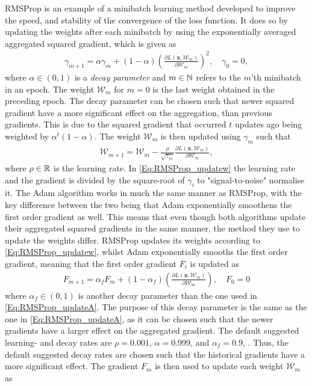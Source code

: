 RMSProp is an example of a minibatch learning method developed to improve the speed, and stability of the convergence of the loss function. It does so by updating the weights after each minibatch by using the exponentially averaged aggregated squared gradient, which is given as
\begin{align}\label{Eq:RMSProp_updateA}
    \gamma_{m+1} = \alpha \gamma_m + \left(1-\alpha\right)\left(\frac{\partial L(\bm{x}, \mathcal{W}_m)}{\partial \mathcal{W}_m}\right)^2,\quad \gamma_0=0,
\end{align}
where $\alpha\in(0,1)$ is a \emph{decay parameter} and $m\in\mathbb{N}$ refers to the $m$'th minibatch in an epoch. The weight $\mathcal{W}_m$ for $m=0$ is the last weight obtained in the preceding epoch. The decay parameter can be chosen such that newer squared gradient have a more significant effect on the aggregation, than previous gradients. This is due to the squared gradient that occurred $t$ updates ago being weighted by $\alpha^{t}(1-\alpha)$. The weight $\mathcal{W}_m$ is then updated using $\gamma_m$ such that
\begin{align}\label{Eq:RMSProp_updatew}
    \mathcal{W}_{m+1} = \mathcal{W}_{m} - \frac{\rho}{\sqrt{\gamma_m}} \frac{\partial L(\bm{x}, \mathcal{W}_m)}{\partial \mathcal{W}_m},
\end{align}
where $\rho\in\mathbb{R}$ is the learning rate. In \eqref{Eq:RMSProp_updatew} the learning rate and the gradient is divided by the square-root of $\gamma_i$ to "signal-to-noise" normalise it. The Adam algorithm works in much the same manner as RMSProp, with the key difference between the two being that Adam exponentially smoothens the first order gradient as well. This means that even though both algorithms update their aggregated squared gradients in the same manner, the method they use to update the weights differ. RMSProp updates its weights according to \eqref{Eq:RMSProp_updatew}, whilst Adam exponentially smooths the first order gradient, meaning that the first order gradient $F_i$ is updated as
\begin{align}\label{Eq:Adam_updateF}
    F_{m+1} = \alpha_fF_m + \left(1-\alpha_f\right)\left(\frac{\partial L(\bm{x}, \mathcal{W}_m)}{\partial \mathcal{W}_m}\right),\quad F_0=0
\end{align}
where $\alpha_f\in(0,1)$ is another decay parameter than the one used in \eqref{Eq:RMSProp_updateA}. The purpose of this decay parameter is the same as the one in \eqref{Eq:RMSProp_updateA}, as it can be chosen such that the newer gradients have a larger effect on the aggregated gradient. The default suggested learning- and decay rates are $\rho=0.001$, $\alpha=0.999$, and $\alpha_f=0.9$, \citep[p. 141]{NN}. Thus, the default suggested decay rates are chosen such that the historical gradients have a more significant effect. The gradient $F_m$ is then used to update each weight $\mathcal{W}_{m}$ as
